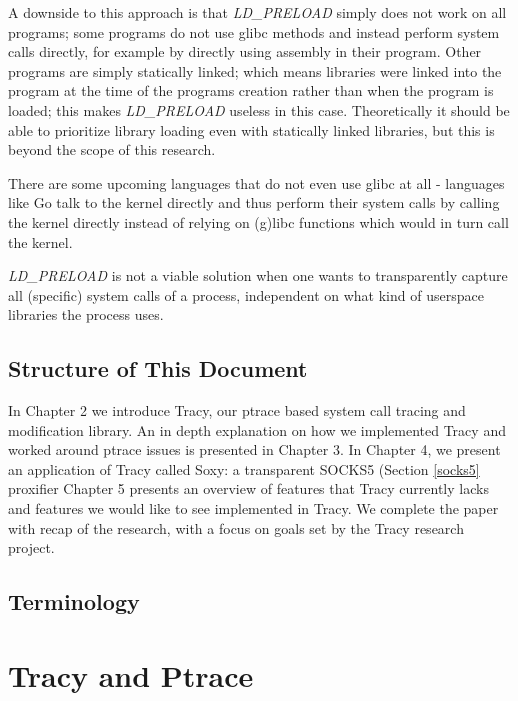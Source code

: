 \documentclass[a4paper, 10pt]{report}
\begin{document}
A downside to this approach is that \textit{LD\_PRELOAD} simply does not work
on all programs; some programs do not use glibc methods and instead perform
system calls directly, for example by directly using assembly in their program.
Other programs are simply statically linked; which means libraries were linked
into the program at the time of the programs creation rather than when the
program is loaded; this makes \textit{LD\_PRELOAD} useless in this case.
Theoretically it should be able to prioritize library loading even with
statically linked libraries, but this is beyond the scope of this research.

There are some upcoming languages that do not even use glibc at all - languages
like Go \cite{golang} talk to the kernel directly and thus perform their
system calls by calling the kernel directly instead of
relying on (g)libc functions which would in turn call the kernel.

\textit{LD\_PRELOAD} is not a viable solution when one wants to transparently capture
all (specific) system calls of a process, independent on what kind of
userspace libraries the process uses.

\section{Structure of This Document}

In Chapter 2 we introduce Tracy, our ptrace based system call tracing and
modification library. An in depth explanation on how we implemented Tracy and
worked around ptrace issues is presented in Chapter 3. In Chapter 4, we present
an application of Tracy called Soxy: a transparent SOCKS5 (Section \ref{socks5}
proxifier Chapter 5 presents an overview of features that Tracy currently lacks
and features we would like to see implemented in Tracy.
We complete the paper with recap of the research, with a focus on goals set by
the Tracy research project.

\section{Terminology}



\chapter{Tracy and Ptrace}
\end{document}
